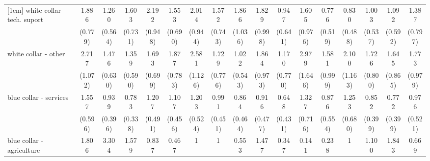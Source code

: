 {\begin{tabular}{l*{16}{c}}
[1em]
white collar - tech. suport&       1.886         &       1.260         &       1.603         &       2.192         &       1.553         &       2.014         &       1.572         &       1.866         &       1.829         &       0.947         &       1.605         &       0.776         &       0.830         &       1.003         &       1.092         &       1.387         \\
                    &     (0.779)         &     (0.564)         &     (0.731)         &     (0.948)         &     (0.690)         &     (0.944)         &     (0.743)         &     (1.036)         &     (0.998)         &     (0.641)         &     (0.976)         &     (0.519)         &     (0.488)         &     (0.537)         &     (0.592)         &     (0.797)         \\
[1em]
white collar - other&       2.717\sym{*}  &       1.476         &       1.359         &       1.693         &       1.877         &       2.581\sym{*}  &       1.729         &       1.022         &       1.864         &       1.170         &       2.979\sym{*}  &       1.581         &       2.100         &       1.726         &       1.645         &       1.773         \\
                    &     (1.072)         &     (0.630)         &     (0.590)         &     (0.699)         &     (0.783)         &     (1.126)         &     (0.776)         &     (0.543)         &     (0.973)         &     (0.770)         &     (1.646)         &     (0.999)         &     (1.163)         &     (0.800)         &     (0.865)         &     (0.979)         \\
[1em]
blue collar - services&       1.557         &       0.939         &       0.783         &       1.207         &       1.107         &       1.203         &       0.991         &       0.864         &       0.916         &       0.648         &       1.327         &       0.876         &       1.253         &       0.852         &       0.772         &       0.976         \\
                    &     (0.596)         &     (0.396)         &     (0.338)         &     (0.491)         &     (0.456)         &     (0.524)         &     (0.451)         &     (0.464)         &     (0.477)         &     (0.431)         &     (0.716)         &     (0.554)         &     (0.680)         &     (0.399)         &     (0.399)         &     (0.521)         \\
[1em]
blue collar - agriculture&       1.806         &       3.304         &       1.579         &       0.837         &       0.467         &           1         &           1         &       0.553         &       1.477         &       0.347         &       0.141         &       0.238         &           1         &       1.100         &       1.843         &       0.669         \\

\end{tabular}}
